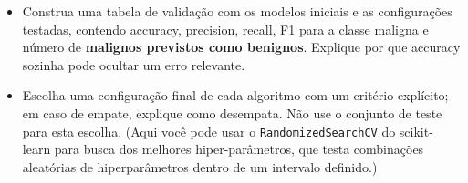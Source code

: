 \documentclass[11pt]{article}
\providecommand{\tightlist}{%
      \setlength{\itemsep}{0pt}\setlength{\parskip}{0pt}}
\begin{document}
\begin{itemize}
\tightlist
\item
  Construa uma tabela de validação com os modelos iniciais e as
  configurações testadas, contendo accuracy, precision, recall, F1 para
  a classe maligna e número de \textbf{malignos previstos como
  benignos}. Explique por que accuracy sozinha pode ocultar um erro
  relevante.
\item
  Escolha uma configuração final de cada algoritmo com um critério
  explícito; em caso de empate, explique como desempata. Não use o
  conjunto de teste para esta escolha. (Aqui você pode usar o
  \texttt{RandomizedSearchCV} do scikit-learn para busca dos melhores
  hiper-parâmetros, que testa combinações aleatórias de hiperparâmetros
  dentro de um intervalo definido.)
\end{itemize}
\end{document}
